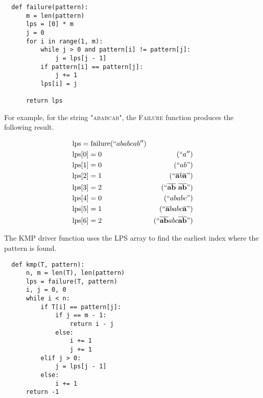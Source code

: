 \begin{verbatim}
  def failure(pattern):
      m = len(pattern)
      lps = [0] * m
      j = 0
      for i in range(1, m):
          while j > 0 and pattern[i] != pattern[j]:
              j = lps[j - 1]
          if pattern[i] == pattern[j]:
              j += 1
          lps[i] = j

      return lps
\end{verbatim}

\noindent For example, for the string \textsc{"ababcab"}, the \textsc{Failure} function produces the following result.

\begin{align*}
  &\mathrm{lps} = \mathrm{failure}(``ababcab'') \\
  &\mathrm{lps}[0] = 0 & (``a'') \\
  &\mathrm{lps}[1] = 0 & (``ab") \\
  &\mathrm{lps}[2] = 1 & (``\mathbf{\overline{a}}b\mathbf{\overline{a}}") \\
  &\mathrm{lps}[3] = 2 & (``\mathbf{\overline{ab}}\ \mathbf{\overline{ab}}") \\
  &\mathrm{lps}[4] = 0 & (``ababc") \\
  &\mathrm{lps}[5] = 1 & (``\mathbf{\overline{a}}babc\mathbf{\overline{a}}") \\
  &\mathrm{lps}[6] = 2 & (``\mathbf{\overline{ab}}abc\mathbf{\overline{ab}}")
\end{align*}

\noindent The \textsc{KMP} driver function uses the \textsc{LPS} array to find the earliest index where the pattern is found.

\begin{verbatim}
  def kmp(T, pattern):
      n, m = len(T), len(pattern)
      lps = failure(T, pattern)
      i, j = 0, 0
      while i < n:
          if T[i] == pattern[j]:
              if j == m - 1:
                  return i - j
              else:
                  i += 1
                  j += 1
          elif j > 0:
              j = lps[j - 1]
          else:
              i += 1
      return -1
\end{verbatim}

